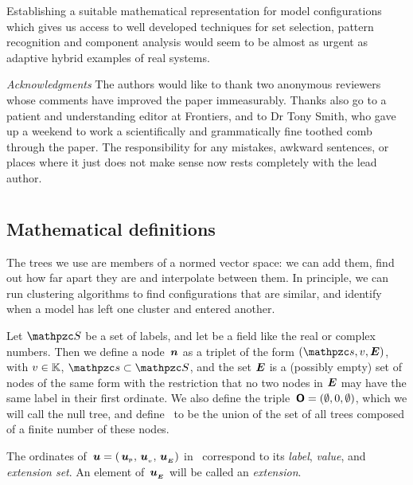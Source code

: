 Establishing a suitable math\-e\-mat\-i\-cal represen\-tation for model
con\-fig\-ur\-a\-tions which gives us access to well developed techniques for
set selection, pattern recognition and component analysis would seem
to be almost as urgent as adaptive hybrid examples of real systems.


\noindent\emph{Acknowledgments}\linebreak
The authors would like to thank two anonymous reviewers whose comments
have improved the paper immeasurably.  Thanks also go to a patient and
understanding editor at Frontiers, and to Dr Tony Smith, who gave up a
weekend to work a scientifically and grammatically fine toothed comb
through the paper.  The responsibility for any mistakes, awkward
sentences, or places where it just does not make sense now rests
completely with the lead author.



%
%





\onecolumn

\section{\appendixname}
\subsection{Mathematical definitions}\label{AppTrees}
The trees we use are members of a normed vector space: we can add
them, find out how far apart they are and interpolate between them. In
principle, we can run clustering algorithms to find con\-fig\-ur\-a\-tions
that are similar, and identify when a model has left one cluster and
entered another.


\begin{definition}\label{defdomain}
  Let $\mc{S}$ be a set of labels, and let \TFIELD be a field like
  the real or complex numbers. Then we define a node $\,\boldsymbol{n}$ as a
  triplet of the form $(\mc{s}, v, \set{E})$, with $v \in \mathbb{K}$,
  $\mc{s} \subset \mc{S}$, and the set $\boldsymbol{E}$ is a (possibly empty)
  set of nodes of the same form with the restriction that no two nodes
  in $\boldsymbol{E}$ may have the same label in their first ordinate.  We
  also define the triple $\,\boldsymbol{\mathsf{O}} = (\emptyset, 0, \emptyset)$,
  which we will call the null tree, and define \TDOM\ to be the union
  of the set of all trees composed of a finite number of these nodes.

  The ordinates of $\,\boldsymbol{u} = ({\,\boldsymbol{u}}_{{}_{\mathsf{P}}}, {\,\boldsymbol{u}}_{{}_{v}}, {\,\boldsymbol{u}}_{{}_{\boldsymbol{E}}})$ in
  \TDOM\ correspond to its \emph{label}, \emph{value}, and
  \emph{extension set}.  An element of ${\,\boldsymbol{u}}_{{}_{\boldsymbol{E}}}$ will be called an
  \emph{extension}.
\end{definition}


